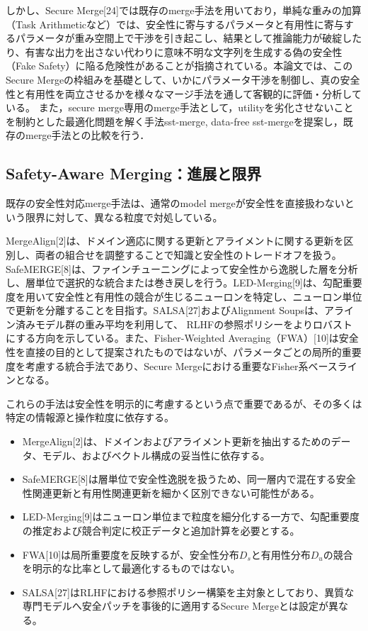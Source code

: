 \documentclass{article}
\begin{document}
しかし、Secure Merge[24]では既存のmerge手法を用いており，単純な重みの加算（Task Arithmeticなど）では、安全性に寄与するパラメータと有用性に寄与するパラメータが重み空間上で干渉を引き起こし、結果として推論能力が破綻したり、有害な出力を出さない代わりに意味不明な文字列を生成する偽の安全性（Fake Safety）に陥る危険性があることが指摘されている。本論文では、このSecure Mergeの枠組みを基礎として、いかにパラメータ干渉を制御し、真の安全性と有用性を両立させるかを様々なマージ手法を通して客観的に評価・分析している。
また，secure merge専用のmerge手法として，utilityを劣化させないことを制約とした最適化問題を解く手法sst-merge, data-free sst-mergeを提案し，既存のmerge手法との比較を行う．

\subsection{Safety-Aware Merging：進展と限界}
\label{app:safety-aware-merging}

既存の安全性対応merge手法は、通常のmodel mergeが安全性を直接扱わないという限界に対して、異なる粒度で対処している。

MergeAlign[2]は、ドメイン適応に関する更新とアライメントに関する更新を区別し、両者の組合せを調整することで知識と安全性のトレードオフを扱う。SafeMERGE[8]は、ファインチューニングによって安全性から逸脱した層を分析し、層単位で選択的な統合または巻き戻しを行う。LED-Merging[9]は、勾配重要度を用いて安全性と有用性の競合が生じるニューロンを特定し、ニューロン単位で更新を分離することを目指す。SALSA[27]およびAlignment Soupsは、アライン済みモデル群の重み平均を利用して、
RLHFの参照ポリシーをよりロバストにする方向を示している。また、Fisher-Weighted Averaging（FWA）[10]は安全性を直接の目的として提案されたものではないが、パラメータごとの局所的重要度を考慮する統合手法であり、Secure Mergeにおける重要なFisher系ベースラインとなる。

これらの手法は安全性を明示的に考慮するという点で重要であるが、その多くは特定の情報源と操作粒度に依存する。

\begin{itemize}
\item MergeAlign[2]は、ドメインおよびアライメント更新を抽出するためのデータ、モデル、およびベクトル構成の妥当性に依存する。
\item SafeMERGE[8]は層単位で安全性逸脱を扱うため、同一層内で混在する安全性関連更新と有用性関連更新を細かく区別できない可能性がある。
\item LED-Merging[9]はニューロン単位まで粒度を細分化する一方で、勾配重要度の推定および競合判定に校正データと追加計算を必要とする。
\item FWA[10]は局所重要度を反映するが、安全性分布\(D_s\)と有用性分布\(D_u\)の競合を明示的な比率として最適化するものではない。
\item SALSA[27]はRLHFにおける参照ポリシー構築を主対象としており、異質な専門モデルへ安全パッチを事後的に適用するSecure Mergeとは設定が異なる。
\end{itemize}
\end{document}
